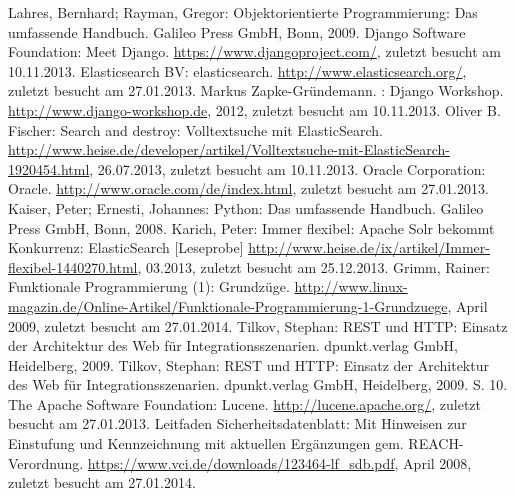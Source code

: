 \begin{thebibliography}{XXXXXX-JJJJa}



\renewcommand{\bibname}{A. ~Literaturverzeichnis}
\setcounter{chapter}{1}


 Lahres, Bernhard; Rayman, Gregor:
Objektorientierte Programmierung:
Das umfassende Handbuch. Galileo Press GmbH, Bonn, 2009.
 Django Software Foundation: Meet Django.
\url{https://www.djangoproject.com/}, zuletzt besucht am 10.11.2013.
 Elasticsearch BV: elasticsearch.
\url{http://www.elasticsearch.org/}, zuletzt besucht am 27.01.2013.
 Markus Zapke-Gründemann. : Django Workshop.
\url{http://www.django-workshop.de}, 2012, zuletzt besucht am 10.11.2013.
 Oliver B. Fischer: Search and destroy:
Volltextsuche mit ElasticSearch.
\url{http://www.heise.de/developer/artikel/Volltextsuche-mit-ElasticSearch-1920454.html},
26.07.2013, zuletzt besucht am 10.11.2013.
 Oracle Corporation: Oracle.
\url{http://www.oracle.com/de/index.html}, zuletzt besucht am 27.01.2013.
 Kaiser, Peter; Ernesti, Johannes: Python:
Das umfassende Handbuch. Galileo Press GmbH, Bonn, 2008.
 Karich, Peter: Immer flexibel:
Apache Solr bekommt Konkurrenz: ElasticSearch [Leseprobe]
\url{http://www.heise.de/ix/artikel/Immer-flexibel-1440270.html},
03.2013, zuletzt besucht am 25.12.2013.
 Grimm, Rainer: Funktionale Programmierung (1):
Grundzüge.
\url{http://www.linux-magazin.de/Online-Artikel/Funktionale-Programmierung-1-Grundzuege}, April 2009, zuletzt
besucht am 27.01.2014.
 Tilkov, Stephan: REST und HTTP: Einsatz der
Architektur des Web für Integrationsszenarien. dpunkt.verlag GmbH, Heidelberg, 2009.
 Tilkov, Stephan: REST und HTTP: Einsatz
der Architektur des Web für Integrationsszenarien. dpunkt.verlag GmbH,
Heidelberg, 2009. S. 10.
 The Apache Software Foundation: Lucene.
\url{http://lucene.apache.org/}, zuletzt besucht am 27.01.2013.
 Leitfaden Sicherheitsdatenblatt: Mit
Hinweisen zur Einstufung und Kennzeichnung mit aktuellen Ergänzungen
gem. REACH-Verordnung. 
\url{https://www.vci.de/downloads/123464-lf_sdb.pdf}, April 2008, zuletzt
besucht am 27.01.2014.



\end{thebibliography}
